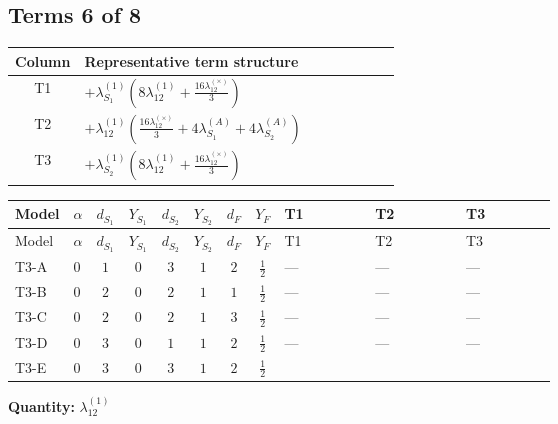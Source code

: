\documentclass[8pt]{article}
\begin{document}
\begin{landscape}
\subsection*{Terms 6 of 8}
\begin{center}
\begin{tabular}{@{}c >{\raggedright\arraybackslash}p{0.82\linewidth}@{}}
\toprule
Column & Representative term structure \\
\midrule
T1 & \(\displaystyle +{\lambda_{S_1}^{(1)}} \left(8 {\lambda_{12}^{(1)}}+\frac{16 {\lambda_{12}^{(\times)}}}{3}\right)\) \\
\midrule
T2 & \(\displaystyle +{\lambda_{12}^{(1)}} \left(\frac{16 {\lambda_{12}^{(\times)}}}{3}+4 {\lambda_{S_1}^{(A)}}+4 {\lambda_{S_2}^{(A)}}\right)\) \\
\midrule
T3 & \(\displaystyle +{\lambda_{S_2}^{(1)}} \left(8 {\lambda_{12}^{(1)}}+\frac{16 {\lambda_{12}^{(\times)}}}{3}\right)\) \\
\midrule
\bottomrule
\end{tabular}
\end{center}
\smallskip
\tiny
\begin{longtable}{@{}llcccccc >{\raggedright\arraybackslash}p{0.21\linewidth} >{\raggedright\arraybackslash}p{0.21\linewidth} >{\raggedright\arraybackslash}p{0.21\linewidth}@{}}
\toprule
Model & $\alpha$ & $d_{S_1}$ & $Y_{S_1}$ & $d_{S_2}$ & $Y_{S_2}$ & $d_F$ & $Y_F$ & T1 & T2 & T3 \\
\midrule
\endfirsthead
\toprule
Model & $\alpha$ & $d_{S_1}$ & $Y_{S_1}$ & $d_{S_2}$ & $Y_{S_2}$ & $d_F$ & $Y_F$ & T1 & T2 & T3 \\
\midrule
\endhead
T3-A & $0$ & $1$ & $0$ & $3$ & $1$ & $2$ & $\frac{1}{2}$ & --- & --- & --- \\
\midrule
T3-B & $0$ & $2$ & $0$ & $2$ & $1$ & $1$ & $\frac{1}{2}$ & --- & --- & --- \\
\midrule
T3-C & $0$ & $2$ & $0$ & $2$ & $1$ & $3$ & $\frac{1}{2}$ & --- & --- & --- \\
\midrule
T3-D & $0$ & $3$ & $0$ & $1$ & $1$ & $2$ & $\frac{1}{2}$ & --- & --- & --- \\
\midrule
T3-E & $0$ & $3$ & $0$ & $3$ & $1$ & $2$ & $\frac{1}{2}$ & \scriptsize\adjustbox{max width=\linewidth}{$\begin{gathered} +{\lambda_{S_1}^{(1)}} \left(8 {\lambda_{12}^{(1)}}+\frac{16 {\lambda_{12}^{(\times)}}}{3}\right)\end{gathered}$} & \scriptsize\adjustbox{max width=\linewidth}{$\begin{gathered} +{\lambda_{12}^{(1)}} \left(\frac{16 {\lambda_{12}^{(\times)}}}{3}+4 {\lambda_{S_1}^{(A)}}+4 {\lambda_{S_2}^{(A)}}\right)\end{gathered}$} & \scriptsize\adjustbox{max width=\linewidth}{$\begin{gathered} +{\lambda_{S_2}^{(1)}} \left(8 {\lambda_{12}^{(1)}}+\frac{16 {\lambda_{12}^{(\times)}}}{3}\right)\end{gathered}$} \\
\midrule
\bottomrule
\end{longtable}
\clearpage
\noindent\textbf{Quantity: }$\lambda_{12}^{(1)}$\par\smallskip

\end{landscape}
\end{document}
